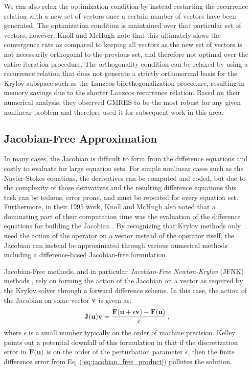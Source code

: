 We can also relax the optimization condition by instead restarting the
recurrence relation with a new set of vectors once a certain number of
vectors have been generated. The optimization condition is maintained
over that particular set of vectors, however, Knoll and McHugh note
that this ultimately slows the convergence rate as compared to keeping
all vectors as the new set of vectors is not necessarily orthogonal to
the previous set, and therefore not optimal over the entire iteration
procedure. The orthogonality condition can be relaxed by using a
recurrence relation that does not generate a strictly orthonormal
basis for the Krylov subspace such as the Lanzcos biorthogonalization
procedure, resulting in memory savings due to the shorter Lanzcos
recurrence relation. Based on their numerical analysis, they observed
GMRES to be the most robust for any given nonlinear problem and
therefore used it for subsequent work in this area.

\subsection{Jacobian-Free Approximation}
\label{subsec:jacobian_free_approximation}
In many cases, the Jacobian is difficult to form from the difference
equations and costly to evaluate for large equation sets. For simple
nonlinear cases such as the Navier-Stokes equations, the derivatives
can be computed and coded, but due to the complexity of those
derivatives and the resulting difference equations this task can be
tedious, error prone, and must be repeated for every equation
set. Furthermore, in their 1995 work, Knoll and McHugh also noted that
a dominating part of their computation time was the evaluation of the
difference equations for building the Jacobian
\cite{knoll_newton-krylov_1995}. By recognizing that Krylov methods
only need the action of the operator on a vector instead of the
operator itself, the Jacobian can instead be approximated through
various numerical methods including a difference-based Jacobian-free
formulation.

Jacobian-Free methods, and in particular \textit{Jacobian-Free
  Newton-Krylov} (JFNK) methods \cite{knoll_jacobian-free_2004}, rely
on forming the action of the Jacobian on a vector as required by the
Krylov solver through a forward difference scheme. In this case, the
action of the Jacobian on some vector $\mathbf{v}$ is given as:
\begin{equation}
  \mathbf{J}(\mathbf{u})\mathbf{v} = \frac{\mathbf{F}(\mathbf{u} + \epsilon \mathbf{v}) -
    \mathbf{F}(\mathbf{u})}{\epsilon}\:,
  \label{eq:jacobian_free_product}
\end{equation}
where $\epsilon$ is a small number typically on the order of machine
precision. Kelley \cite{kelley_iterative_1995} points out a potential
downfall of this formulation in that if the discretization error in
$\mathbf{F}(\mathbf{u})$ is on the order of the perturbation parameter
$\epsilon$, then the finite difference error from
Eq~(\ref{eq:jacobian_free_product}) pollutes the solution. 

